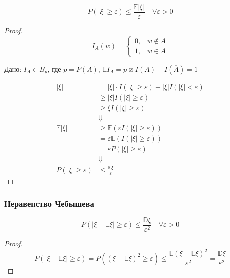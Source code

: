 \begin{theorem}
    \[P(|\xi| \geq \varepsilon) \leq \frac{\mathbb{E}|\xi|}{\varepsilon} \quad \forall \varepsilon > 0\]
\end{theorem}
\begin{proof}
    \[I_A(w) = \begin{cases}
            0, & w \notin A \\
            1, & w \in A
        \end{cases}\]

    Дано: \(I_A \in B_p\), где \(p = P(A)\), \(\mathbb{E}I_A = p\) и \(I(A) + I(\overline A) = 1\)

    \begin{align}
        |\xi|                     & = |\xi| \cdot I(|\xi| \geq \varepsilon) + |\xi| I(|\xi| < \varepsilon) \\
                                  & \geq |\xi| I(|\xi| \geq \varepsilon)                                   \\
                                  & \geq \xi I(|\xi| \geq \varepsilon)                                     \\
                                  & \Downarrow                                                             \\
        \mathbb{E}|\xi|           & \geq \mathbb{E}(\varepsilon I(|\xi| \geq \varepsilon))                 \\
                                  & = \varepsilon \mathbb{E}(I(|\xi| \geq \varepsilon))                    \\
                                  & = \varepsilon P(|\xi| \geq \varepsilon)                                \\
                                  & \Downarrow                                                             \\
        P(|\xi| \geq \varepsilon) & \leq \frac{\mathbb{E}\xi}{\varepsilon}
    \end{align}
\end{proof}

\subsubsection{Неравенство Чебышева}

\begin{theorem}
    \[P(|\xi - \mathbb{E}\xi| \geq \varepsilon) \leq \frac{\mathbb{D}\xi}{\varepsilon^2} \quad \forall \varepsilon > 0\]
\end{theorem}
\begin{proof}
    \[P(|\xi - \mathbb{E}\xi| \geq \varepsilon) = P((\xi - \mathbb{E}\xi)^2 \geq \varepsilon) \leq \frac{\mathbb{E}(\xi - \mathbb{E}\xi)^2}{\varepsilon^2} = \frac{\mathbb{D}\xi}{\varepsilon^2}\]
\end{proof}

